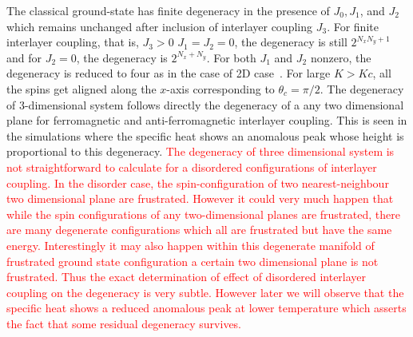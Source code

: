 \indent  The classical ground-state has finite degeneracy in the presence of $J_0, J_1$, and $J_2$ which remains unchanged after inclusion of interlayer coupling $J_3$. For finite interlayer coupling, that is, $J_3>0$ $J_1=J_2=0$, the degeneracy is still $2^{N_xN_y+1}$  and for $J_2=0$, the degeneracy is $2^{N_x+N_y}$. For both $J_1$ and $J_2$ nonzero, the degeneracy is reduced to four as in the case of 2D case~\cite{vijigiri2018classical}. For large $K>Kc$, all the spins get aligned along the $x$-axis corresponding to $\theta_c=\pi/2$. The degeneracy of 3-dimensional system follows directly the degeneracy of a any  two dimensional plane for ferromagnetic and anti-ferromagnetic interlayer coupling. This is seen in the simulations where the specific heat shows an anomalous peak whose height is proportional to this degeneracy. \textcolor{red}{The degeneracy of three dimensional system is not straightforward to calculate for a disordered configurations of interlayer coupling.  In the disorder case, the spin-configuration of two nearest-neighbour two dimensional plane are frustrated. However it could very much happen that while the spin configurations of any two-dimensional planes are frustrated, there are many degenerate configurations which all are frustrated but have the same energy. Interestingly it may also happen within this degenerate manifold of frustrated ground state configuration a certain two dimensional plane is not frustrated. Thus the exact determination of effect of disordered interlayer coupling on the degeneracy is very subtle. However later we will observe that the specific heat shows a reduced anomalous  peak at lower temperature which asserts the fact that some residual degeneracy survives.}
